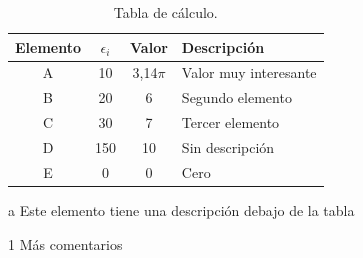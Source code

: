 \begin{appendixd}
	\enabletablerowcolor[2] %
	\begin{table}[H]
		\begin{threeparttable}
		\centering
		\caption{Tabla de cálculo.}
		\begin{tabular}{cccC{4cm}}
			\hline
			\textbf{Elemento} & $\epsilon_i$ & \textbf{Valor} & \textbf{Descripción} \bigstrut \\
			\hline
			A     & 10    & 3,14$\pi$ & Valor muy interesante \\
			B     & 20    & 6 & Segundo elemento \\
			C     & 30    & 7 & Tercer elemento \\
			D     & 150    & 10 & Sin descripción \\
			E     & 0    & 0 & Cero \\
			\hline
			\end{tabular}
		\begin{tablenotes}
			\item[a] Este elemento tiene una descripción debajo de la tabla
			\item[1] Más comentarios
		\end{tablenotes}
		\end{threeparttable}
		\label{tab:anexo-1}
	\end{table}
	\disabletablerowcolor %

\end{appendixd}